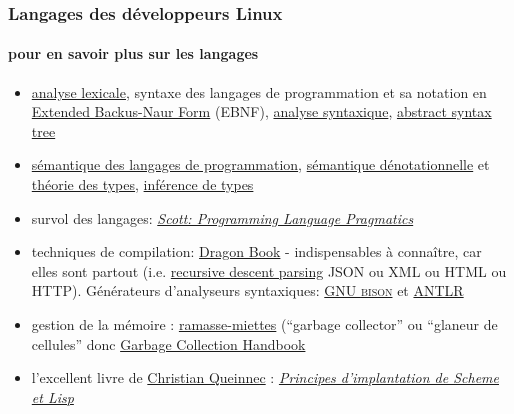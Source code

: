 \documentclass[xcolor=svgnames,final,smaller,a4]{beamer}
\begin{document}
\begin{frame}
  \frametitle{Langages des développeurs Linux}
  \framesubtitle{pour en savoir plus sur les langages}

  \begin{itemize}

    \item
      \href{https://fr.wikipedia.org/wiki/Analyse_lexicale}{analyse
        lexicale}, syntaxe des langages de programmation et sa notation en
      \href{https://fr.wikipedia.org/wiki/Extended_Backus-Naur_Form}{Extended
        Backus-Naur Form} (EBNF),
      \href{https://fr.wikipedia.org/wiki/Analyse_syntaxique}{analyse
        syntaxique}, \href{https://en.wikipedia.org/wiki/Abstract_syntax_tree}{abstract syntax tree}

    \item
      \href{https://fr.wikipedia.org/wiki/Sémantique_des_langages_de_programmation}{sémantique
        des langages de programmation},
      \href{https://fr.wikipedia.org/wiki/Sémantique_dénotationnelle}{sémantique
        dénotationnelle} et
      \href{https://fr.wikipedia.org/wiki/Théorie_des_types}{théorie
        des types}, \href{https://fr.wikipedia.org/wiki/Inférence_de_types}{inférence de types}
      
    \item survol des langages:
      \href{https://www.filepicker.io/api/file/jjQ29xA9RP29juOcGbRL}{\textit{Scott:
          Programming Language Pragmatics}}

    \item techniques de compilation:
      \href{https://en.wikipedia.org/wiki/Compilers:_Principles,_Techniques,_and_Tools}{Dragon
        Book} - indispensables à connaître, car elles sont partout
      (i.e. \href{https://en.wikipedia.org/wiki/Recursive_descent_parser}{recursive
        descent parsing} JSON ou XML ou HTML ou HTTP). Générateurs
      d'analyseurs syntaxiques:
      \href{https://www.gnu.org/software/bison/}{GNU \textsc{bison}}
      et \href{https://antlr.org/}{ANTLR}

    \item gestion de la mémoire :
      \href{https://fr.wikipedia.org/wiki/Ramasse-miettes_(informatique)}{ramasse-miettes}
      (``garbage collector'' ou ``glaneur de cellules'' donc
      \href{https://gchandbook.org/}{Garbage Collection Handbook}

    \item l'excellent livre de \href{https://pages.lip6.fr/Christian.Queinnec/WWW/}{Christian Queinnec} : \href{https://hal.inria.fr/hal-01305784/}{\textit{Principes d'implantation de Scheme et Lisp}}
  \end{itemize}
\end{frame}
\end{document}
